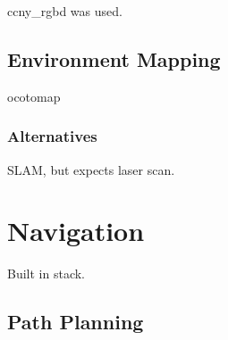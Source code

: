 ccny\_rgbd \cite{ccny_rgbd} was used.

\subsection{Environment Mapping}

ocotomap

\subsubsection{Alternatives}

SLAM, but expects laser scan.


\section{Navigation}

Built in stack.

\subsection{Path Planning}

